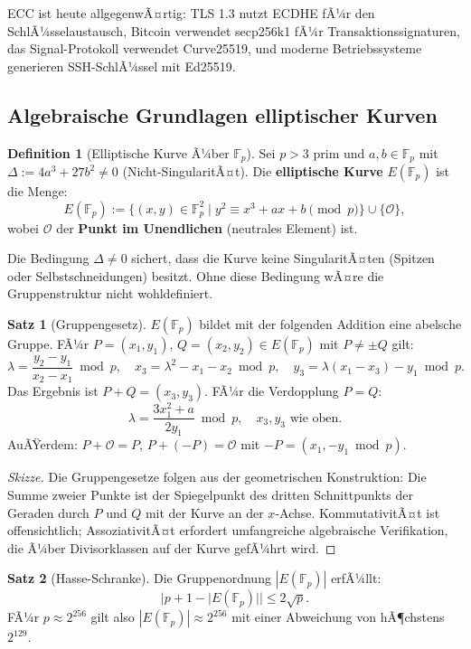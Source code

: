 ﻿\documentclass[a4paper,12pt]{scrreprt}
\theoremstyle{definition}
\newtheorem{definition}{Definition}[section]
\newtheorem{satz}{Satz}[section]
\begin{document}
ECC ist heute allgegenwÃ¤rtig: TLS 1.3 \cite{Res18} nutzt ECDHE fÃ¼r den SchlÃ¼sselaustausch, Bitcoin \cite{Nak08} verwendet secp256k1 fÃ¼r Transaktionssignaturen, das Signal-Protokoll verwendet Curve25519, und moderne Betriebssysteme generieren SSH-SchlÃ¼ssel mit Ed25519.

\subsection{Algebraische Grundlagen elliptischer Kurven}

\begin{definition}[Elliptische Kurve Ã¼ber $\mathbb{F}_p$]
Sei $p > 3$ prim und $a, b \in \mathbb{F}_p$ mit $\Delta := 4a^3 + 27b^2 \neq 0$ (Nicht-SingularitÃ¤t). Die \textbf{elliptische Kurve} $E(\mathbb{F}_p)$ ist die Menge:
\[
E(\mathbb{F}_p) := \{(x, y) \in \mathbb{F}_p^2 \mid y^2 \equiv x^3 + ax + b \pmod{p}\} \cup \{\mathcal{O}\},
\]
wobei $\mathcal{O}$ der \textbf{Punkt im Unendlichen} (neutrales Element) ist.
\end{definition}

Die Bedingung $\Delta \neq 0$ sichert, dass die Kurve keine SingularitÃ¤ten (Spitzen oder Selbstschneidungen) besitzt. Ohne diese Bedingung wÃ¤re die Gruppenstruktur nicht wohldefiniert.

\begin{satz}[Gruppengesetz]
$E(\mathbb{F}_p)$ bildet mit der folgenden Addition eine abelsche Gruppe. FÃ¼r $P = (x_1, y_1)$, $Q = (x_2, y_2) \in E(\mathbb{F}_p)$ mit $P \neq \pm Q$ gilt:
\[
\lambda = \frac{y_2 - y_1}{x_2 - x_1} \bmod p, \quad x_3 = \lambda^2 - x_1 - x_2 \bmod p, \quad y_3 = \lambda(x_1 - x_3) - y_1 \bmod p.
\]
Das Ergebnis ist $P + Q = (x_3, y_3)$. FÃ¼r die Verdopplung $P = Q$:
\[
\lambda = \frac{3x_1^2 + a}{2y_1} \bmod p, \quad x_3, y_3 \text{ wie oben}.
\]
AuÃŸerdem: $P + \mathcal{O} = P$, $P + (-P) = \mathcal{O}$ mit $-P = (x_1, -y_1 \bmod p)$.
\end{satz}

\begin{proof}[Skizze]
Die Gruppengesetze folgen aus der geometrischen Konstruktion: Die Summe zweier Punkte ist der Spiegelpunkt des dritten Schnittpunkts der Geraden durch $P$ und $Q$ mit der Kurve an der $x$-Achse. KommutativitÃ¤t ist offensichtlich; AssoziativitÃ¤t erfordert umfangreiche algebraische Verifikation, die Ã¼ber Divisorklassen auf der Kurve gefÃ¼hrt wird.
\end{proof}

\begin{satz}[Hasse-Schranke]
Die Gruppenordnung $|E(\mathbb{F}_p)|$ erfÃ¼llt:
\[
|p + 1 - |E(\mathbb{F}_p)|| \leq 2\sqrt{p}.
\]
FÃ¼r $p \approx 2^{256}$ gilt also $|E(\mathbb{F}_p)| \approx 2^{256}$ mit einer Abweichung von hÃ¶chstens $2^{129}$.
\end{satz}
\end{document}
